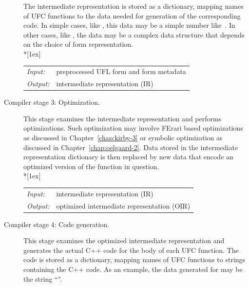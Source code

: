 \begin{description}
  The intermediate representation is stored as a dictionary, mapping
  names of UFC functions to the data needed for generation of the
  corresponding code. In simple cases, like ,
  this data may be a simple number like~. In other cases,
  like \-, the data may be a
  complex data structure that depends on the choice of form
  representation. \\*[1ex]
  \begin{tabular}{ll}
    \emph{Input:}  & preprocessed UFL form and form metadata \\
    \emph{Output:} & intermediate representation (IR)
  \end{tabular}
\item[Compiler stage 3: Optimization.]
  This stage examines the intermediate representation and performs
  optimizations. Such optimization may involve FErari based
  optimizations as discussed in Chapter~\ref{chap:kirby-3} or symbolic
  optimization as discussed in Chapter~\ref{chap:oelgaard-2}.
  Data stored in the
  intermediate representation dictionary is then replaced by new data
  that encode an optimized version of the function in question. \\*[1ex]
  \begin{tabular}{ll}
    \emph{Input:}  & intermediate representation (IR) \\
    \emph{Output:} & optimized intermediate representation (OIR)
  \end{tabular}
\item[Compiler stage 4: Code generation.]
  This stage examines the optimized intermediate representation and
  generates the actual C++ code for the body of each UFC function. The
  code is stored as a dictionary, mapping names of UFC functions to
  strings containing the C++ code. As an example, the data generated for
   may be the string ``''.


\end{description}

